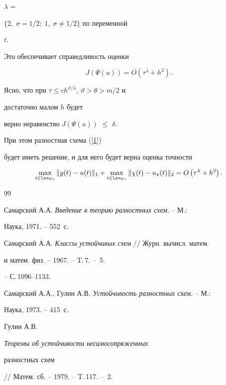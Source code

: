 {$\lambda$ = 


$\{2,\; \sigma =1/2;\; 1, \; \sigma \neq 1/2\}$ по переменной 


$t$. 


Это обеспечивает справедливость оценки


$$


J\left(\Psi(u)\right)=O\left( {\tau^\lambda+h^2} \right). 


$$


Ясно, что при $\tau \leq c h^{\vartheta /\lambda }$, $\vartheta>\theta>m/2$ и 


достаточно малом $h$ будет 


верно неравенство $J\left(\Psi(u)\right)$ $\leq $ $\delta $.


При этом разностная схема (\ref{1})


будет иметь решение, и для него будет верна оценка точности 


$$


\max_{t\in \ov \omega_\tau}\|y(t)-u(t)\|_1+


\max_{t\in \ov \omega_\tau}\|\chi(t)-u_x(t)\|_2= O\left( 


{\tau^\lambda+h^2}\right).


$$








\begin{thebibliography}{99}







Самарский А.А. {\em Введение в теорию разностных схем}. -- М.: 


Наука, 1971. -- 552~с.




Самарский А.А. {\em Классы устойчивых схем} // Журн. вычисл. матем.


и матем. физ. -- 1967. -- T.\,7. -- \No\,5.


-- С.\,1096--1133.




Самарский А.А., Гулин А.В. {\em Устойчивость разностных схем}. -- М.: 


Наука, 1973. -- 415~с.




Гулин А.В. {\em Теоремы об устойчивости несамосопряженных 


разностных схем} // Матем. сб. -- 1979. -- T.\,117. -- \No\,2.



\end{thebibliography}}
